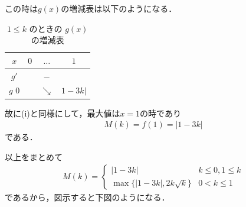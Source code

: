 \documentclass[../../main.tex]{subfiles}
\begin{document}
この時は$g(x)$の増減表は以下のようになる．

\begin{table}[htb]
  \centering
  \caption{$1\le k$ のときの $g(x)$ の増減表}
  \label{tab:variation_k_ge_1}
  \begin{tabular}{c|c|c|c}
    $x$ & $0$ & $\dots$ & $1$ \\ \hline
    $g' $ & & $-$ & \\ \hline
    $g  $ $0$ & & $\searrow$ & $1-3k|$
  \end{tabular}
\end{table}

故に(i)と同様にして，最大値は$x=1$の時であり
\begin{align}
  M(k)=f(1)=|1-3k|
\end{align}
である．
\casesend

以上をまとめて
\begin{align}
  M(k)=
  \begin{cases}
    |1-3k|&k\le0,1\le k \\
    \max\{|1-3k|,2k\sqrt{k}\}&0<k\le1
  \end{cases}
\end{align}
であるから，図示すると下図のようになる．
\end{document}

